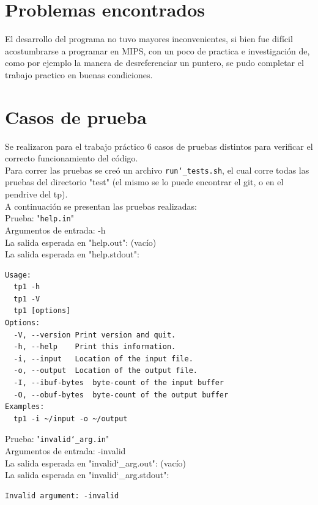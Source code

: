 \documentclass[a4paper,10pt]{article}
\begin{document}
    \section{Problemas encontrados}
El desarrollo del programa no tuvo mayores inconvenientes, si bien fue difícil acostumbrarse a programar en MIPS, con un poco de practica e investigación de, como por ejemplo la manera de desreferenciar un puntero, se pudo completar el trabajo practico en buenas condiciones.

    \section{Casos de prueba}
Se realizaron para el trabajo práctico 6 casos de pruebas distintos para verificar el correcto funcionamiento del código.\\
Para correr las pruebas se creó un archivo \texttt{run\char`_tests.sh}, el cual corre todas las pruebas del directorio "test" (el mismo se lo puede encontrar el git, o en el pendrive del tp).\\
A continuación se presentan las pruebas realizadas:\\

Prueba: "\texttt{help.in}" \\
    Argumentos de entrada: -h\\
    La salida esperada en "help.out": (vacío)\\
    La salida esperada en "help.stdout":
        \begin{Verbatim}
Usage:
  tp1 -h
  tp1 -V
  tp1 [options]
Options:
  -V, --version	Print version and quit.
  -h, --help	Print this information.
  -i, --input	Location of the input file.
  -o, --output	Location of the output file.
  -I, --ibuf-bytes	byte-count of the input buffer
  -O, --obuf-bytes	byte-count of the output buffer
Examples:
  tp1 -i ~/input -o ~/output

  \end{Verbatim}
      
Prueba: "\texttt{invalid\char`_arg.in}" \\
    Argumentos de entrada: -invalid\\
    La salida esperada en "invalid\char`_arg.out": (vacío)\\
    La salida esperada en "invalid\char`_arg.stdout":
        \begin{Verbatim}
Invalid argument: -invalid
  \end{Verbatim}
  
\end{document}
